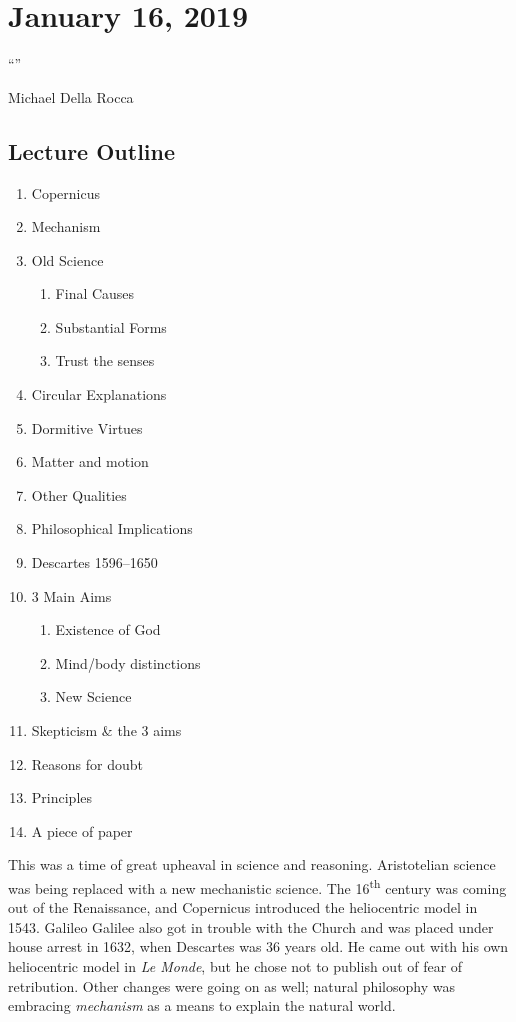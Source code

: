 
\section{January 16, 2019}

\epigraph{``''}{Michael Della Rocca}

\subsection*{Lecture Outline}
\begin{multicols}{2}
\begin{enumerate}
\item Copernicus
\item Mechanism
\item Old Science
\begin{enumerate}
\item Final Causes
\item Substantial Forms
\item Trust the senses
\end{enumerate}
\item Circular Explanations
\item Dormitive Virtues
\item Matter and motion
\item Other Qualities
\item Philosophical Implications
\item Descartes 1596--1650
\item 3 Main Aims
\begin{enumerate}
\item Existence of God
\item Mind/body distinctions
\item New Science
\end{enumerate}
\item Skepticism \& the 3 aims
\item Reasons for doubt
\item Principles
\item A piece of paper
\end{enumerate}
\end{multicols}

This was a time of great upheaval in science and reasoning. Aristotelian science was being replaced with a new mechanistic science. The 16\textsuperscript{th} century was coming out of the Renaissance, and Copernicus introduced the heliocentric model in 1543. Galileo Galilee also got in trouble with the Church and was placed under house arrest in 1632, when Descartes was 36 years old. He came out with his own heliocentric model in \emph{Le Monde}, but he chose not to publish out of fear of retribution. Other changes were going on as well; natural philosophy was embracing \emph{mechanism} as a means to explain the natural world.

